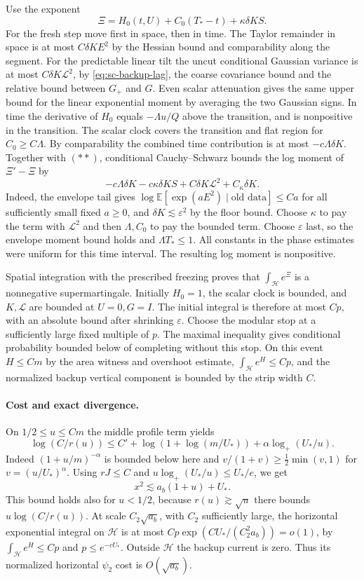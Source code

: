 \documentclass[11pt]{article}
\newcommand{\1}{\mathbf{1}}
\numberwithin{equation}{section}
\newcommand{\E}{\mathbb E}
\begin{document}
Use the exponent
\[
 \Xi=H_0(t,U)+C_0(T_*-t)+\kappa\delta KS .
\]
For the fresh step move first in space, then in time.
The Taylor remainder in space is at most \(C\delta K E^2\)
by the Hessian bound and comparability along the segment.
For the predictable linear tilt the uncut conditional
Gaussian variance is at most \(C\delta K\mathcal L^2\),
by \eqref{eq:sc-backup-lag}, the coarse covariance bound
and the relative bound between \(G_+\) and \(G\).
Even scalar attenuation gives the same upper bound for the
linear exponential moment by averaging the two Gaussian signs.
In time the derivative of \(H_0\) equals \(-\Lambda u/Q\)
above the transition, and is nonpositive in the transition.
The scalar clock covers the transition and flat region for
\(C_0\ge C\Lambda\). By comparability the combined time
contribution is at most \(-c\Lambda\delta K\).
Together with \((**)\), conditional Cauchy--Schwarz
bounds the log moment of \(\Xi'-\Xi\) by
\[
 -c\Lambda\delta K-c\kappa\delta KS
       +C\delta K\mathcal L^2+C_\kappa\delta K .
\]
Indeed, the envelope tail gives
\(\log\E[\exp(aE^2)\mid\text{old data}]\le Ca\) for all
sufficiently small fixed \(a\ge0\), and
\(\delta K\lesssim\varepsilon^2\) by the floor bound.
Choose \(\kappa\) to pay the term with \(\mathcal L^2\)
and then \(\Lambda,C_0\) to pay the bounded term.
Choose \(\varepsilon\) last, so the envelope moment bound
holds and \(\Lambda T_*\le1\). All constants in the
phase estimates were uniform for this time interval.
The resulting log moment is nonpositive.

Spatial integration with the prescribed freezing proves
that \(\int_{\mathcal H}e^\Xi\) is a nonnegative
supermartingale. Initially \(H_0=1\), the scalar clock is
bounded, and \(K,\mathcal L\) are bounded at \(U=0,G=I\).
The initial integral is therefore at most \(Cp\), with
an absolute bound after shrinking \(\varepsilon\).
Choose the modular stop at a sufficiently large fixed
multiple of \(p\). The maximal inequality gives conditional
probability bounded below of completing without this stop.
On this event \(H\le Cm\) by the area witness and overshoot
estimate, \(\int_{\mathcal H}e^H\le Cp\), and the normalized
backup vertical component is bounded by the strip width \(C\).

\paragraph{Cost and exact divergence.}
On \(1/2\le u\le Cm\) the middle profile term yields
\[
 \log(C/r(u))\le C'+\log(1+\log(m/U_*))
       +\alpha\log_+(U_*/u).
\]
Indeed \((1+u/m)^{-\alpha}\) is bounded below here and
\(v/(1+v)\ge\tfrac12\min(v,1)\) for \(v=(u/U_*)^\alpha\).
Using \(rJ\le C\) and \(u\log_+(U_*/u)\le U_*/e\), we get
\[
 x^2\lesssim a_b(1+u)+U_* .
\]
This bound holds also for \(u<1/2\), because
\(r(u)\gtrsim\sqrt u\) there bounds \(u\log(C/r(u))\).
At scale \(C_2\sqrt{a_b}\), with \(C_2\) sufficiently large,
the horizontal exponential integral on \(\mathcal H\) is at
most \(C p\exp(CU_*/(C_2^2a_b))=o(1)\), by
\(\int_{\mathcal H}e^H\le Cp\) and \(p\le e^{-cU_*}\).
Outside \(\mathcal H\) the backup current is zero.
Thus its normalized horizontal \(\psi_2\) cost is
\(O(\sqrt{a_b})\).
\end{document}
